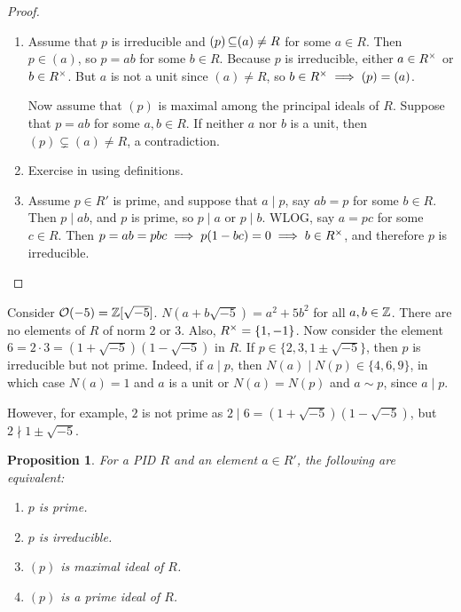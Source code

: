 \documentclass[11pt]{book}
\newcounter{counter}
\newtheorem{proposition}[counter]{Proposition}   \newtheorem{problem}[counter]{Problem}   \newtheorem*{proposition*}{Proposition}   \newtheorem*{lemma*}{Lemma}
\theoremstyle{definition}   \newtheorem{defn}[counter]{Definition} %
\newcommand{\vs}{\vspace{8pt}}
\numberwithin{counter}{chapter}
\begin{document}
\begin{proof}
\begin{enumerate}
\item[(a)] Assume that $p$ is irreducible and $(p) \operatorname{\subseteq} (a) \ne R$ for some $a \in R$. Then $p \in (a)$, so $p = ab$ for some $b \in R$. Because $p$ is irreducible, either $a \in R^{\times}$ or $b \in R^{\times}$. But $a$ is not a unit since $(a) \ne R$, so $b \in R^{\times} \implies (p) = (a)$.

Now assume that $(p)$ is maximal among the principal ideals of $R$. Suppose that $p = ab$ for some $a,b \in R$. If neither $a$ nor $b$ is a unit, then $(p) \subsetneq (a) \ne R$, a contradiction.

\item[(b)] Exercise in using definitions.

\item[(c)] Assume $p \in R'$ is prime, and suppose that $a \mid p$, say $ab = p$ for some $b \in R$. Then $p \mid ab$, and $p$ is prime, so $p \mid a$ or $p \mid b$. WLOG, say $a = pc$ for some $c \in R$. Then $p = ab = pbc \implies p(1-bc) = 0 \implies b \in R^{\times}$, and therefore $p$ is irreducible.
\end{enumerate}
\end{proof}

\vs

\begin{example}
Consider $\mathcal{O}(-5) = \operatorname{\mathbb{Z}}[\sqrt{-5}]$. $N(a+b\sqrt{-5}) = a^2 + 5b^2$ for all $a,b \in \operatorname{\mathbb{Z}}$. There are no elements of $R$ of norm $2$ or $3$. Also, $R^{\times} = \{1,-1\}$. Now consider the element $6 = 2 \cdot 3 = (1+\sqrt{-5})(1-\sqrt{-5})$ in $R$. If $p \in \{2,3,1\pm \sqrt{-5}\}$, then $p$ is irreducible but not prime. Indeed, if $a \mid p$, then $N(a) \mid N(p) \in \{4,6,9\}$, in which case $N(a) = 1$ and $a$ is a unit or $N(a) = N(p)$ and $a \sim p$, since $a \mid p$.

However, for example, $2$ is not prime as $2 \mid 6 = (1+\sqrt{-5})(1-\sqrt{-5})$, but $2 \nmid 1\pm \sqrt{-5}$.
\end{example}

\vs

\begin{proposition}
For a PID $R$ and an element $a \in R'$, the following are equivalent:
\begin{enumerate}
\item[(i)] $p$ is prime.
\item[(ii)] $p$ is irreducible.
\item[(iii)] $(p)$ is maximal ideal of $R$.
\item[(iv)] $(p)$ is a prime ideal of $R$.
\end{enumerate}
\end{proposition}
\end{document}
